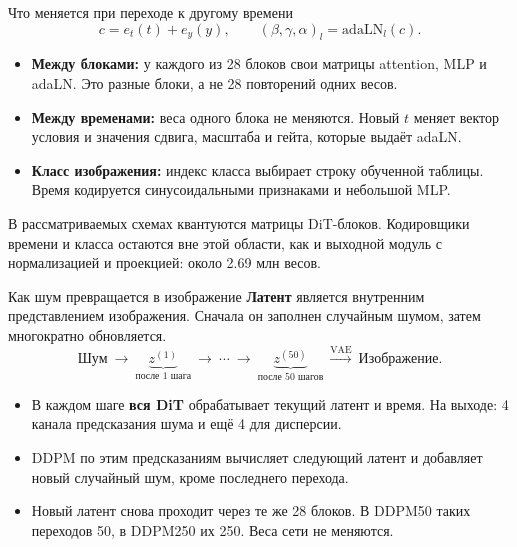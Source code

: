 \documentclass[aspectratio=169,10pt]{beamer}
\newcommand{\takeaway}[1]{\par\vspace{1.5mm}{\bfseries #1\par}}
\newcommand{\smalltext}[1]{{\fontsize{10}{12}\selectfont #1\par}}
\newcommand{\tights}{\setlength{\itemsep}{1.4mm}\setlength{\parsep}{0pt}\setlength{\parskip}{0pt}}
\begin{document}
\begin{frame}[t]{Что меняется при переходе к другому времени}
  \[
    c=e_t(t)+e_y(y),\qquad
    (\beta,\gamma,\alpha)_{l}=\mathrm{adaLN}_{l}(c).
  \]
  \begin{itemize}\tights
    \item \textbf{Между блоками:} у каждого из 28 блоков свои матрицы attention,
    MLP и adaLN. Это разные блоки, а не 28 повторений одних весов.
    \item \textbf{Между временами:} веса одного блока не меняются.
    Новый $t$ меняет вектор условия и значения сдвига, масштаба и гейта,
    которые выдаёт adaLN.
    \item \textbf{Класс изображения:} индекс класса выбирает строку обученной таблицы.
    Время кодируется синусоидальными признаками и небольшой MLP.
  \end{itemize}
  \smalltext{В рассматриваемых схемах квантуются матрицы DiT-блоков.
  Кодировщики времени и класса остаются вне этой области, как и выходной модуль
  с нормализацией и проекцией: около 2.69 млн весов.}
  \takeaway{Разные активации и гейты при разных $t$\par
  не означают разные веса или кодбуки для каждого времени.}
\end{frame}

\begin{frame}[t]{Как шум превращается в изображение}
  \textbf{Латент} является внутренним представлением изображения.
  Сначала он заполнен случайным шумом, затем многократно обновляется.
  \[
    \text{Шум}\ \longrightarrow\
    \underbrace{z^{(1)}}_{\text{после 1 шага}}\ \longrightarrow\
    \cdots\ \longrightarrow\
    \underbrace{z^{(50)}}_{\text{после 50 шагов}}
    \ \xrightarrow{\text{VAE}}\ \text{Изображение}.
  \]
  \begin{itemize}\tights
    \item В каждом шаге \textbf{вся DiT} обрабатывает текущий латент и время.
    На выходе: 4 канала предсказания шума и ещё 4 для дисперсии.
    \item DDPM по этим предсказаниям вычисляет следующий латент и добавляет
    новый случайный шум, кроме последнего перехода.
    \item Новый латент снова проходит через те же 28 блоков.
    В DDPM50 таких переходов 50, в DDPM250 их 250. Веса сети не меняются.
  \end{itemize}
  \takeaway{Траектория генерации: цепочка всех промежуточных латентов.\par
  Для калибровки берутся состояния внутри этой цепочки.}
\end{frame}
\end{document}
